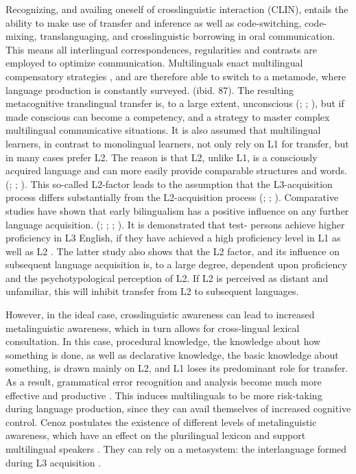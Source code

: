 \documentclass[output=paper]{../langscibook}
\begin{document}
Recognizing, and availing oneself of crosslinguistic interaction (CLIN), entails the ability to make use of transfer and inference as well as code-switching, code-mixing, translanguaging, and crosslinguistic borrowing in oral communication. This means all interlingual correspondences, regularities and contrasts are employed to optimize communication. Multilinguals enact multilingual compensatory strategies \citep[87]{Jessner2006}, and are therefore able to switch to a metamode, where language production is constantly surveyed. (ibid. 87). The resulting metacognitive translingual transfer is, to a large extent, unconscious (\citealt{DeAngelisDewaele2011}; \citealt{GibsonHufeisen2011}; \citealt{Vidgren2013}), but if made conscious can become a competency, and a strategy to master complex multilingual communicative situations. It is also assumed that multilingual learners, in contrast to monolingual learners, not only rely on L1 for transfer, but in many cases prefer L2. The reason is that L2, unlike L1, is a consciously acquired language and can more easily provide comparable structures and words. (\citealt[79]{HerdinaJessner2002b}; \citealt[64]{House2004}; \citealt[178f]{Muller-Lance2006}). This so-called L2-factor leads to the assumption that the L3-acquisition process differs substantially from the L2-acquisition process (\citealt{Hufeisen2011}; \citealt{Cenoz2013Influence}; \citealt{HerdinaJessner2002b}). Comparative studies have shown that early bilingualism has a positive influence on any further language acquisition. (\citealt{CenozValencia1994}; \citealt{Lasagabaster1997}; \citealt{Pilar_Safont2003}; \citealt{Ringbom1987}). It is demonstrated that test- persons achieve higher proficiency in L3 English, if they have achieved a high proficiency level in L1 as well as L2 \citep{DeAngelisJessner2012}. The latter study also shows that the L2 factor, and its influence on subsequent language acquisition is, to a large degree, dependent upon proficiency and the psychotypological perception of L2. If L2 is perceived as distant and unfamiliar, this will inhibit transfer from L2 to subsequent languages. 

However, in the ideal case, crosslinguistic awareness can lead to increased metalinguistic awareness, which in turn allows for cross-lingual lexical consultation. In this case, procedural knowledge, the knowledge about how something is done, as well as declarative knowledge, the basic knowledge about something, is drawn mainly on L2, and L1 loses its predominant role for transfer. As a result, grammatical error recognition and analysis become much more effective and productive \citep{Bialystok2004,GibsonHufeisen2011}. This induces multilinguals to be more risk-taking during language production, since they can avail themselves of increased cognitive control. Cenoz postulates the existence of different levels of metalinguistic awareness, which have an effect on the plurilingual lexicon and support multilingual speakers \citep{Cenoz2013Influence}. They can rely on a metasystem: the interlanguage formed during L3 acquisition \citep[131--161]{HerdinaJessner2002b}. 
\end{document}
